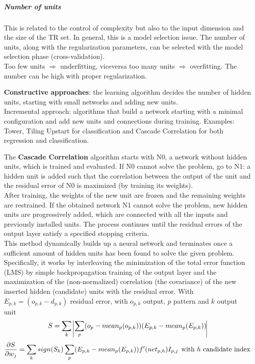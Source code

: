 \documentclass[10pt]{report}
\begin{document}
\subparagraph{Number of units} This is related to the control of complexity but also to the input dimension and the size of the TR set. In general, this is a model selection issue. The number of units, along with the regularization parameters, can be selected with the model selection phase (cross-validation).\\
Too few units $\Rightarrow$ underfitting, viceversa too many units $\Rightarrow$ overfitting. The number can be high with proper regularization.
\begin{list}{}{}
	\item \textbf{Constructive approaches}: the learning algorithm decides the number of hidden units, starting with small networks and adding new units.\\
	Incremental approach: algorithms that build a network starting with a minimal configuration and add new units and connections during training. Examples: Tower, Tiling Upstart for classification and Cascade Correlation for both regression and classification.\begin{list}{}{}
		\item The \textbf{Cascade Correlation} algorithm starts with N0, a network without hidden units, which is trained and evaluated. If N0 cannot solve the problem, go to N1: a hidden unit is added such that the correlation between the output of the unit and the residual error of N0 is maximized (by training its weights).\\
		After training, the weights of the new unit are frozen and the remaining weights are restrained. If the obtained network N1 cannot solve the problem, new hidden units are progressively added, which are connected with all the inputs and previously installed units. The process continues until the residual errors of the output layer satisfy a specified stopping criteria.\\
		This method dynamically builds up a neural network and terminates once a sufficient amount of hidden units has been found to solve the given problem. Specifically, it works by interleaving the minimization of the total error function (LMS) by simple backpropagation training of the output layer and the maximization of the (non-normalized) correlation (the covariance) of the new inserted hidden (candidate) units with the residual error. With $E_{p,k} = (o_{p,k} - d_{p,k})$ residual error, with $o_{p,k}$ output, $p$ pattern and $k$ output unit
		$$S = \sum_k\:\vline\sum_p(o_p - mean_p(o_{p,k}))(E_{p,k} - mean_p(E_{p,k}))\vline$$
		$$\frac{\partial S}{\partial w_j} = \sum_k sign(S_k)\sum_p(E_{p,k} - mean_p(E_{p,k}))f'(net_{p,h})I_{p,j}\:\:\hbox{with }h\hbox{ candidate index}$$

\end{list}
\end{list}
\end{document}
